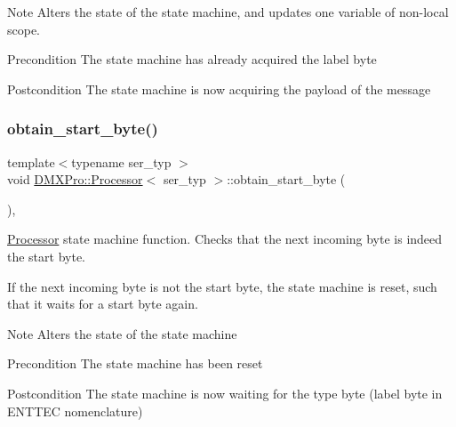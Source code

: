 \begin{DoxyNote}{Note}
Alters the state of the state machine, and updates one variable of non-\/local scope.
\end{DoxyNote}
\begin{DoxyPrecond}{Precondition}
The state machine has already acquired the label byte 
\end{DoxyPrecond}
\begin{DoxyPostcond}{Postcondition}
The state machine is now acquiring the payload of the message 
\end{DoxyPostcond}
\mbox{\label{classDMXPro_1_1Processor_a792bcffc8ca31367baf568305516dac8}} 
\subsubsection{\texorpdfstring{obtain\+\_\+start\+\_\+byte()}{obtain\_start\_byte()}}
{\footnotesize\ttfamily template$<$typename ser\+\_\+typ $>$ \\
void \hyperlink{classDMXPro_1_1Processor}{D\+M\+X\+Pro\+::\+Processor}$<$ ser\+\_\+typ $>$\+::obtain\+\_\+start\+\_\+byte (\begin{DoxyParamCaption}{ }\end{DoxyParamCaption})\hspace{0.3cm}{\ttfamily [inline]}, {\ttfamily [private]}}



\hyperlink{classDMXPro_1_1Processor}{Processor} state machine function. Checks that the next incoming byte is indeed the start byte. 

If the next incoming byte is not the start byte, the state machine is reset, such that it waits for a start byte again.

\begin{DoxyNote}{Note}
Alters the state of the state machine
\end{DoxyNote}
\begin{DoxyPrecond}{Precondition}
The state machine has been reset 
\end{DoxyPrecond}
\begin{DoxyPostcond}{Postcondition}
The state machine is now waiting for the type byte (label byte in E\+N\+T\+T\+EC nomenclature) 
\end{DoxyPostcond}
\mbox{\label{classDMXPro_1_1Processor_ad2e73b51c77d95ff948b2b994eba3cfd}} 
